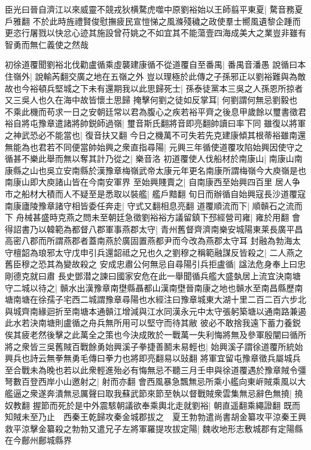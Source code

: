 臣光曰晉自濟江以來威靈不競戎狄横騖虎噬中原劉裕始以王師翦平東夏|{
	騖音務夏戶雅翻}
不於此時旌禮賢俊慰撫疲民宣愷悌之風滌殘穢之政使羣士嚮風遺黎企踵而更恣行屠戮以快忿心迹其施設曾苻姚之不如宜其不能蕩壹四海成美大之業豈非雖有智勇而無仁義使之然哉

初徐道覆聞劉裕北伐勸盧循乘虛襲建康循不從道覆自至番禺|{
	番禺音潘愚}
說循曰本住嶺外|{
	說輸芮翻交廣之地在五嶺之外}
豈以理極於此傳之子孫邪正以劉裕難與為敵故也今裕頓兵堅城之下未有還期我以此思歸死士|{
	孫泰徒黨本三吳之人孫恩所掠者又三吳人也久在海中故皆懷土思歸}
掩擊何劉之徒如反掌耳|{
	何劉謂何無忌劉毅也}
不乘此機而苟求一日之安朝廷常以君為腹心之疾若裕平齊之後息甲歲餘以璽書徵君裕自將屯豫章遣諸將帥鋭師過嶺|{
	璽音斯氏翻將音即亮翻帥讀曰率下同}
雖復以將軍之神武恐必不能當也|{
	復音扶又翻}
今日之機萬不可失若先克建康傾其根蒂裕雖南還無能為也君若不同便當帥始興之衆直指尋陽|{
	元興三年循使道覆攻陷始興因使守之}
循甚不樂此舉而無以奪其計乃從之|{
	樂音洛}
初道覆使人伐船材於南康山|{
	南康山南康縣之山也吳立安南縣於漢豫章梅嶺武帝太康元年更名南康所謂梅嶺今大庾嶺是也南康山即大庾諸山皆在今南安軍界}
至始興賤賣之|{
	自南康西至始興四百里}
居人争市之船材大積而人不疑至是悉取以裝艦|{
	艦戶黯翻}
旬日而辦循自始興寇長沙道覆寇南康廬陵豫章諸守相皆委任奔走|{
	守式又翻相息亮翻}
道覆順流而下|{
	順贑石之流而下}
舟械甚盛時克燕之問未至朝廷急徵劉裕裕方議留鎮下邳經營司雍|{
	雍於用翻}
會得詔書乃以韓範為都督八郡軍事燕郡太守|{
	青州舊督齊濟南樂安城陽東莱長廣平昌高密八郡而所謂燕郡者蓋南燕於廣固置燕都尹而今改為燕郡太守耳}
封融為勃海太守檀韶為琅邪太守戊申引兵還韶祗之兄也久之劉穆之稱範融謀反皆殺之|{
	二人燕之舊臣穆之恐其為變故殺之}
安成忠肅公何無忌自尋陽引兵拒盧循|{
	諡法危身奉上曰忠剛德克就曰肅}
長史鄧潜之諫曰國家安危在此一舉聞循兵艦大盛埶居上流宜決南塘守二城以待之|{
	贑水出漢豫章南壄縣聶都山漢南壄晉南康之地也贑水至南昌縣歷南塘南塘在徐孺子宅西二城謂豫章尋陽也水經注曰豫章城東大湖十里二百二百六步北與城齊南緣迴折至南塘本通贑江增減與江水同漢永元中太守張躬築塘以通南路兼遏此水若決南塘則盧循之舟兵無所用可以堅守而待其敝}
彼必不敢捨我遠下蓄力養鋭俟其疲老然後擊之此萬全之策也今決成敗於一戰萬一失利悔將無及參軍殷闡曰循所將之衆皆三吳舊賊百戰餘勇始興溪子拳捷善鬭未易輕也|{
	始興溪子謂徐道覆所統始興兵也詩云無拳無勇毛傳曰拳力也將即亮翻易以䜴翻}
將軍宜留屯豫章徵兵屬城兵至合戰未為晚也若以此衆輕進殆必有悔無忌不聽三月壬申與徐道覆遇於豫章賊令彊弩數百登西岸小山邀射之|{
	射而亦翻}
會西風暴急飄無忌所乘小艦向東㟁賊乘風以大艦逼之衆遂奔潰無忌厲聲曰取我蘇武節來節至執以督戰賊衆雲集無忌辭色無撓|{
	撓奴教翻}
握節而死於是中外震駭朝議欲奉乘輿北走就劉裕|{
	朝直遥翻乘繩證翻}
既而知賊未至乃止　西秦王乾歸攻秦金城郡拔之　夏王勃勃遣尚書胡金纂攻平涼秦王興救平涼擊金纂殺之勃勃又遣兄子左將軍羅提攻拔定陽|{
	魏收地形志敷城郡有定陽縣在今鄜州鄜城縣界}
